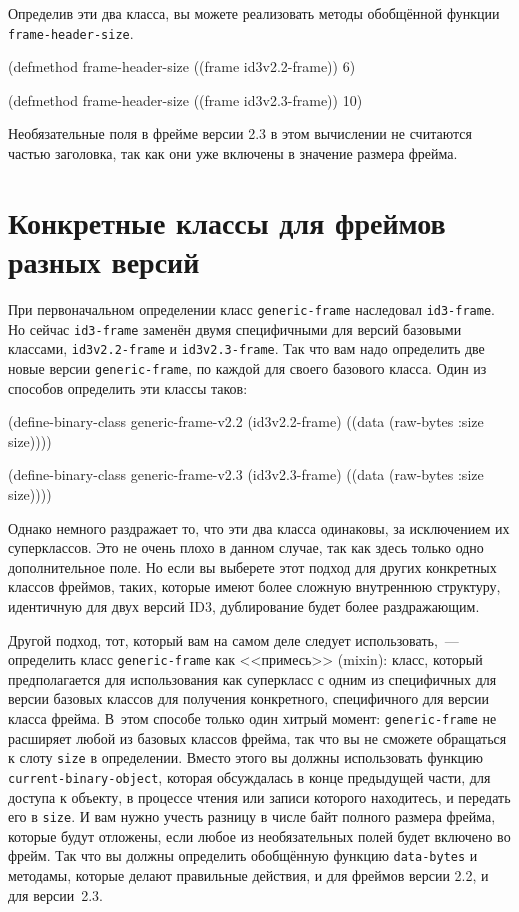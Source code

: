 Определив эти два класса, вы можете реализовать методы обобщённой функции
\lstinline{frame-header-size}.

\begin{myverb}
(defmethod frame-header-size ((frame id3v2.2-frame)) 6)

(defmethod frame-header-size ((frame id3v2.3-frame)) 10)
\end{myverb}

Необязательные поля в фрейме версии 2.3 в этом вычислении не считаются частью заголовка,
так как они уже включены в значение размера фрейма.

\section{Конкретные классы для фреймов разных версий}

При первоначальном определении класс \lstinline{generic-frame} наследовал \lstinline{id3-frame}. Но
сейчас \lstinline{id3-frame} заменён двумя специфичными для версий базовыми классами,
\lstinline{id3v2.2-frame} и \lstinline{id3v2.3-frame}. Так что вам надо определить две новые версии
\lstinline{generic-frame}, по каждой для своего базового класса. Один из способов определить
эти классы таков:

\begin{myverb}
(define-binary-class generic-frame-v2.2 (id3v2.2-frame)
  ((data (raw-bytes :size size))))

(define-binary-class generic-frame-v2.3 (id3v2.3-frame)
  ((data (raw-bytes :size size))))
\end{myverb}

Однако немного раздражает то, что эти два класса одинаковы, за исключением их
суперклассов. Это не очень плохо в данном случае, так как здесь только одно дополнительное
поле. Но если вы выберете этот подход для других конкретных классов фреймов, таких,
которые имеют более сложную внутреннюю структуру, идентичную для двух версий ID3,
дублирование будет более раздражающим.

Другой подход, тот, который вам на самом деле следует использовать,~--- определить класс
\lstinline{generic-frame} как <<примесь>> (mixin): класс, который предполагается для
использования как суперкласс с одним из специфичных для версии базовых классов для
получения конкретного, специфичного для версии класса фрейма. В~этом способе только один
хитрый момент: \lstinline{generic-frame} не расширяет любой из базовых классов фрейма, так что
вы не сможете обращаться к слоту \lstinline{size} в определении. Вместо этого вы должны
использовать функцию \lstinline{current-binary-object}, которая обсуждалась в конце предыдущей
части, для доступа к объекту, в процессе чтения или записи которого находитесь, и передать
его в \lstinline{size}. И вам нужно учесть разницу в числе байт полного размера фрейма, которые
будут отложены, если любое из необязательных полей будет включено во фрейм. Так что вы
должны определить обобщённую функцию \lstinline{data-bytes} и методамы, которые делают
правильные действия, и для фреймов версии 2.2, и для версии~2.3.

